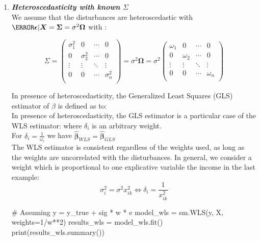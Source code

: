 \begin{enumerate}
	\item \textbf{\emph{Heteroscedasticity with known $\Sigma$}}\\
		We assume that the disturbances are heteroscedastic with $\V{\bm{\epsilon}|
		\bm{X}}=\bm{\Sigma}=\sigma^{2}\bm{\Omega}$ with :
\begin{center}
\begin{equation*}
	\Sigma=
	\begin{pmatrix}
		\sigma_{1}^{2} & 0 & \cdots & 0\\
		0 & \sigma_{2}^{2} & \cdots & 0\\
		\vdots & \vdots & \ddots & \vdots\\
		0 & 0 & \cdots & \sigma_{n}^{2}\\
	\end{pmatrix}
	= \sigma^{2}\bm{\Omega}=\sigma^{2}
	\begin{pmatrix}
		\omega_{1} & 0 & \cdots & 0\\
		0 & \omega_{2} & \cdots & 0\\
		\vdots & \vdots & \ddots & \vdots\\
		0 & 0 & \cdots & \omega_{n}\\
	\end{pmatrix}
\end{equation*}
\end{center}
In presence of heteroscedasticity, the Generalized Least Squares (GLS) estimator of $\beta$ is 
defined as to:
\\
In presence of heteroscedasticity, the GLS estimator is a particular case of the WLS estimator:
 where $\delta_{i}$ is an arbitrary weight.\\
For $\delta_{i}=\frac{1}{\omega_{i}}$ we have $\hat{\bm{\beta}}_{WLS}=\hat{\bm{\beta}}_{GLS}$\\
The WLS estimator is consistent regardless of the weights used, as long as the weights are 
uncorrelated with the disturbances. In general, we consider a weight which is proportional to
one explicative variable the income in the last example: 
$$ \sigma_{i}^{2} = \sigma^{2}x_{ik}^{2} \Leftrightarrow \delta_{i}=\dfrac{1}{x_{ik}^{2}}$$
\begin{python}
# Assuming y = y_true + sig * w * e
model_wls = sm.WLS(y, X, weights=1/w**2)
results_wls = model_wls.fit()
print(results_wls.summary())
\end{python}


\end{enumerate}
